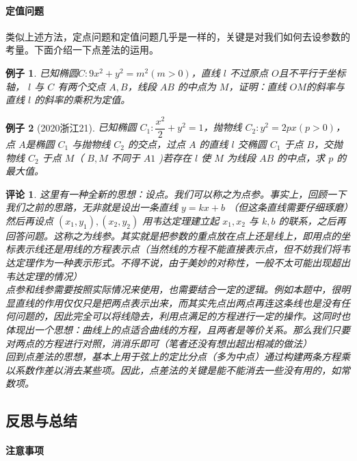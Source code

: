 \documentclass[a4paper,10pt,twoside]{article}
\newtheorem{example}{例子}[section]
\newtheorem{remark}{评论}
\begin{document}
\paragraph{定值问题}
类似上述方法，定点问题和定值问题几乎是一样的，关键是对我们如何去设参数的考量。下面介绍一下点差法的运用。
\begin{example}
    已知椭圆$ C:9x^2+y^2=m^2(m>0) $，直线 $ l  $ 不过原点 $ O  $且不平行于坐标轴， $ l  $ 与 $ C  $ 有两个交点 $ A,B  $，线段 $ AB  $ 的中点为 $ M  $，证明：直线 $ OM  $的斜率与直线 $ l  $ 的斜率的乘积为定值。
\end{example}
\begin{example}[2020浙江21]
    已知椭圆 $ C_1:\dfrac{x^2}{2}+y^2=1 $，抛物线 $ C_2:y^2=2px(p>0) $，点 $ A  $是椭圆 $ C_1 $ 与抛物线 $ C_2  $ 的交点，过点 $ A  $ 的直线 $ l $ 交椭圆 $ C_1  $ 于点 $ B  $，交抛物线 $ C_2 $ 于点 $ M $（ $ B,M  $ 不同于 $ A 1 $ )若存在 $ l  $ 使 $ M  $ 为线段 $ AB  $ 的中点，求 $ p  $ 的最大值。   
\end{example}
\begin{remark}
    这里有一种全新的思想：设点。我们可以称之为点参。事实上，回顾一下我们之前的思路，无非就是设出一条直线
     $ y=kx+b $ （但这条直线需要仔细琢磨）然后再设点 $ (x_1,y_1),(x_2,y_2) $ 用韦达定理建立起 $ x_1,x_2 $ 与 $ k,b  $ 的联系，之后再回答问题。这称之为线参。其实就是把参数的重点放在点上还是线上，即用点的坐标表示线还是用线的方程表示点（当然线的方程不能直接表示点，但不妨我们将韦达定理作为一种表示形式。不得不说，由于美妙的对称性，一般不太可能出现超出韦达定理的情况）
    \\点参和线参需要按照实际情况来使用，也需要结合一定的逻辑。例如本题中，很明显直线的作用仅仅只是把两点表示出来，而其实先点出两点再连这条线也是没有任何问题的，因此完全可以将线隐去，利用点满足的方程进行一定的操作。这同时也体现出一个思想：曲线上的点适合曲线的方程，且两者是等价关系。那么我们只要对两点的方程进行对照，消消乐即可（笔者还没有想出超出相减的做法）
    \\回到点差法的思想，基本上用于弦上的定比分点（多为中点）通过构建两条方程乘以系数作差以消去某些项。因此，点差法的关键是能不能消去一些没有用的，如常数项。
\end{remark}
\subsection{反思与总结}
\paragraph{注意事项}
\end{document}
